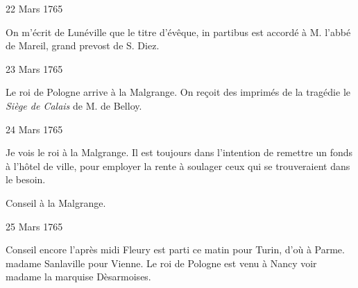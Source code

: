                      \begin{diary}{22 Mars 1765}{}
                        
                        
                           On m'écrit de Lunéville que
                           le titre d'évêque,
                           in partibus est accordé à M.
                              l'abbé de Mareil,
                           grand prevost de S. Diez. \bigskip
        
        
                     \end{diary}

                     \begin{diary}{23 Mars 1765}{}
                        
                        
                           Le roi de Pologne arrive à la Malgrange.
                           On reçoit des
                           imprimés de la tragédie le \emph{Siège de
                                 Calais} de
                           M. de
                              Belloy. \bigskip
        
        
                     \end{diary}

                     \begin{diary}{24 Mars 1765}{}
                        
                         Je vois le roi à la
                              Malgrange. Il est toujours
                           dans l'intention de remettre un fonds à l'hôtel
                              de ville, pour employer la rente à soulager ceux
                           qui se trouveraient dans le besoin. \bigskip
        
        
                         Conseil à la Malgrange. \bigskip
        
        
                     \end{diary}

                     \begin{diary}{25 Mars 1765}{}
                        
                         Conseil encore l'après midi
                           Fleury est parti ce matin pour
                              Turin,
                           d'où à Parme. madame Sanlaville pour
                           Vienne. Le roi de Pologne est venu à Nancy
                           voir madame la marquise Dèsarmoises. \bigskip
        
        
                     \end{diary}

